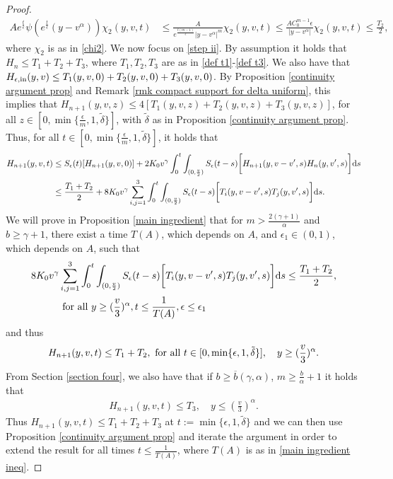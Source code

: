 \documentclass[11pt]{article}
\numberwithin{equation}{section}
\newcommand{\der}{\textup{d}}
\begin{document}
\begin{proof}
\begin{align*}
    Ae^{\frac{t}{\epsilon}}\psi(e^{\frac{t}{\epsilon}}(y-v^{\alpha}))\chi_{2}(y,v,t)&\leq \frac{A}{e^{\frac{t(m-1)}{\epsilon}}|y-v^{\alpha}|^{m}}\chi_{2}(y,v,t)\leq \frac{AC_{0}^{m-1}\epsilon}{|y-v^{\alpha}|}\chi_{2}(y,v,t)\leq \frac{T_{2}}{2},
\end{align*}
where $\chi_{2}$ is as in \eqref{chi2}. We now focus on \eqref{step ii}. By assumption it holds that $H_{n}\leq T_{1}+T_{2}+T_{3}$, where  $T_{1},T_{2},T_{3}$ are as in \eqref{def t1}-\eqref{def t3}. We also have that   $H_{\epsilon,\textup{in}}(y,v)\leq T_{1}(y,v,0)+T_{2}(y,v,0)+T_{3}(y,v,0)$. By Proposition \ref{continuity argument prop} and Remark \ref{rmk compact support for delta uniform}, this implies that $H_{n+1}(y,v,z)\leq 4[T_{1}(y,v,z)+T_{2}(y,v,z)+T_{3}(y,v,z)]$, for all $z\in[0,\min\{\frac{\epsilon}{m},1,\tilde{\delta}\}]$, with $\tilde{\delta}$ as in Proposition \ref{continuity argument prop}. Thus, for all $t\in[0,\min\{\frac{\epsilon}{m},1,\tilde{\delta}\}]$, it holds that
\begin{align*}
H_{n+1}(y,v,t)&\leq S_{\epsilon}(t)[H_{n+1}(y,v,0) ] +2K_{0}v^{\gamma}\int_{0}^{t}\int_{(0,\frac{v}{2})}
S_{\epsilon}(t-s)\bigg[H_{n+1}(y,v-v',s) H_{n}(y,v',s)\bigg]\der s
\\
&\leq \frac{T_{1}+T_{2}}{2}+8K_{0}v^{\gamma}\sum_{i,j=1}^{3}\int_{0}^{t}\int_{(0,\frac{v}{2})}
S_{\epsilon}(t-s)\bigg[T_{i}(y,v-v',s) T_{j}(y,v',s)\bigg]\der s.
\end{align*}
We will prove in Proposition \ref{main ingredient} that for $m>\frac{2(\gamma+1)}{\alpha}$ and $b\geq \gamma+1$, there exist a time $T(A)$, which depends on $A$,  and $\epsilon_{1}\in(0,1)$, which depends on $A$, such that 
\begin{align}\label{main ingredient ineq}
8K_{0}v^{\gamma} & \sum_{i,j=1}^{3}\int_{0}^{t}\int_{(0,\frac{v}{2})}
S_{\epsilon}(t-s)\bigg[T_{i}(y,v-v',s) T_{j}(y,v',s)\bigg]\der s\leq \frac{T_{1}+T_{2}}{2}, \\
&\textup{ for all }y\geq (\frac{v}{3})^{\alpha}, t\leq \frac{1}{T(A)}, \epsilon\leq \epsilon_{1}\nonumber
    \end{align}
and thus 
\begin{align*}
H_{n+1}(y,v,t)\leq T_{1}+T_{2},\textup{ for all } t\in[0,\min\{\epsilon,1,\tilde{\delta}\}], \quad y\geq (\frac{v}{3})^{\alpha}.\end{align*}
 From Section \ref{section four}, we also have that if $b\geq \overline{b}(\gamma,\alpha)$, $m\geq \frac{b}{\alpha}+1$ it holds that
 \begin{align*}
H_{n+1}(y,v,t)\leq T_{3}, \quad y\leq (\frac{v}{3})^{\alpha}.
\end{align*}
Thus $H_{n+1}(y,v,t)\leq T_{1}+T_{2}+T_{3}$ at $t:=\min\{\epsilon,1,\tilde{\delta}\}$ and we can then use Proposition \ref{continuity argument prop} and iterate the argument in order to extend the result for all times $t\leq \frac{1}{T(A)}$, where $T(A)$ is as in \eqref{main ingredient ineq}.
\end{proof}
\end{document}
